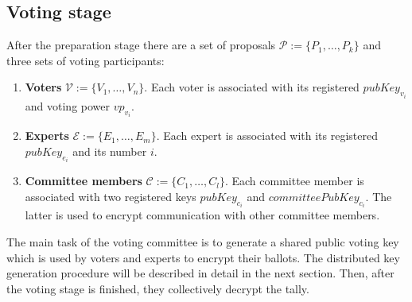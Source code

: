 
\subsection{Voting stage}
After the preparation stage there are a set of proposals $\mathcal{P}:=\{P_1,\ldots, P_k \}$ and three sets of voting participants:
\begin{enumerate}
    \item \textbf{Voters} $\mathcal{V}:=\{V_1,\ldots, V_n \}$. Each voter is associated with its registered $pubKey_{v_i}$ and voting power $vp_{v_i}$.
    \item \textbf{Experts} $\mathcal{E}:=\{E_1,\ldots, E_m \}$. Each expert is associated with its registered $pubKey_{e_i}$ and its number $i$. 
    \item \textbf{Committee members} $\mathcal{C}:=\{C_1,\ldots, C_l \}$. Each committee member is associated with two registered keys $pubKey_{c_i}$ and $committeePubKey_{c_i}$. The latter is used to encrypt communication with other committee members.
\end{enumerate}

The main task of the voting committee is to generate a shared public voting key which is used by voters and experts to encrypt their ballots. The distributed key generation procedure will be described in detail in the next section. Then, after the voting stage is finished, they collectively decrypt the tally.


